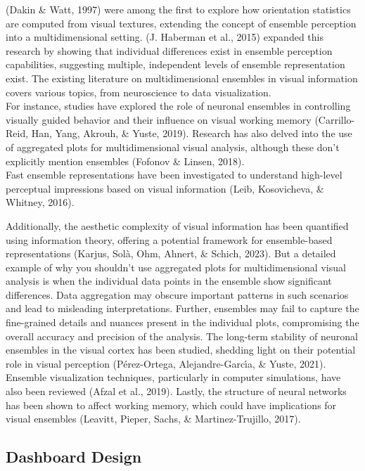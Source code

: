 \documentclass[print]{nuthesis}
\begin{document}
(Dakin \& Watt, 1997) were among the first to explore how orientation statistics are computed from visual textures, extending the concept of ensemble perception into a multidimensional setting.
(J. Haberman et al., 2015) expanded this research by showing that individual differences exist in ensemble perception capabilities, suggesting multiple, independent levels of ensemble representation exist.
The existing literature on multidimensional ensembles in visual information covers various topics, from neuroscience to data visualization.\\
For instance, studies have explored the role of neuronal ensembles in controlling visually guided behavior and their influence on visual working memory (Carrillo-Reid, Han, Yang, Akrouh, \& Yuste, 2019).
Research has also delved into the use of aggregated plots for multidimensional visual analysis, although these don't explicitly mention ensembles (Fofonov \& Linsen, 2018).\\
Fast ensemble representations have been investigated to understand high-level perceptual impressions based on visual information (Leib, Kosovicheva, \& Whitney, 2016).

Additionally, the aesthetic complexity of visual information has been quantified using information theory, offering a potential framework for ensemble-based representations (Karjus, Solà, Ohm, Ahnert, \& Schich, 2023).
But a detailed example of why you shouldn't use aggregated plots for multidimensional visual analysis is when the individual data points in the ensemble show significant differences. Data aggregation may obscure important patterns in such scenarios and lead to misleading interpretations.
Further, ensembles may fail to capture the fine-grained details and nuances present in the individual plots, compromising the overall accuracy and precision of the analysis.
The long-term stability of neuronal ensembles in the visual cortex has been studied, shedding light on their potential role in visual perception (Pérez-Ortega, Alejandre-Garcı́a, \& Yuste, 2021).
Ensemble visualization techniques, particularly in computer simulations, have also been reviewed (Afzal et al., 2019).
Lastly, the structure of neural networks has been shown to affect working memory, which could have implications for visual ensembles (Leavitt, Pieper, Sachs, \& Martinez-Trujillo, 2017).

\hypertarget{dashboard-design-1}{%
\subsection{Dashboard Design}\label{dashboard-design-1}}
\end{document}
